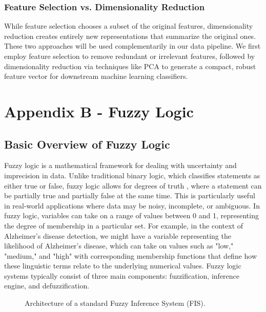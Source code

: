\documentclass[openany]{book}
\begin{document}
\subsection{Feature Selection vs. Dimensionality Reduction}
While feature selection chooses a subset of the original features, dimensionality reduction creates entirely new representations that summarize the original ones. These two approaches will be used complementarily in our data pipeline. We first employ feature selection to remove redundant or irrelevant features, followed by dimensionality reduction via techniques like PCA to generate a compact, robust feature vector for downstream machine learning classifiers.


\chapter*{Appendix B - Fuzzy Logic}
\label{app:B}
\section{Basic Overview of Fuzzy Logic}
\label{sec:overview_fuzzy}
Fuzzy logic is a mathematical framework for dealing with uncertainty and imprecision in data. Unlike traditional binary logic, which classifies statements as either true or false, fuzzy logic allows for degrees of truth \cite{zadeh1965fuzzy}, where a statement can be partially true and partially false at the same time. This is particularly useful in real-world applications where data may be noisy, incomplete, or ambiguous. In fuzzy logic, variables can take on a range of values between 0 and 1, representing the degree of membership in a particular set. For example, in the context of Alzheimer's disease detection, we might have a variable representing the likelihood of Alzheimer's disease, which can take on values such as "low," "medium," and "high" with corresponding membership functions that define how these linguistic terms relate to the underlying numerical values. Fuzzy logic systems typically consist of three main components: fuzzification, inference engine, and defuzzification. 

\begin{figure}[htpb]
    \centering
    \caption{Architecture of a standard Fuzzy Inference System (FIS).}
    \label{fig:fis_architecture}
\end{figure}
\end{document}

